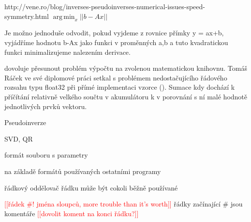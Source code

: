 \documentclass[10pt,draft,oneside]{fithesis2}
\newcommand\fixme[1]{\textcolor{red}{[[#1]]}}
\begin{document}
http://vene.ro/blog/inverses-pseudoinverses-numerical-issues-speed-symmetry.html
\(\operatorname{arg\,min}_x ||b - Ax||\)

Je možno jednoduše odvodit, pokud vyjdeme z rovnice přímky y = ax+b, vyjádříme hodnotu b-Ax jako funkci v proměnných a,b a tuto kvadratickou funkci minimalizujeme nalezením derivace.

dovoluje přesunout problém výpočtu na zvolenou matematickou knihovnu. Tomáš Ráček ve své diplomové práci setkal s problémem nedostačujícího řádového rozsahu typu float32 při přímé implementaci vzorce (). Sumace kdy dochází k příčítání relativně velkého součtu v akumulátoru k v porovnání s ní malé hodnotě jednotlivých prvků vektoru.

Pseudoinverze

SVD, QR

% 
% 
% 
% 

formát souboru s parametry

na základě formátů používaných ostatními programy

řádkový
oddělovač řádku může být cokoli běžně používané

\fixme{řádek #! jména sloupců, more trouble than it's worth}
řádky začínající # jsou komentáře \fixme{dovolit koment na konci řádku?}
\end{document}
